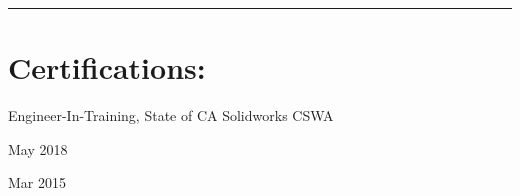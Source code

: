 
\vspace{-.5ex}

{\hspace{-1.73in}\noindent\color{dblue}\rule{6.935in}{0.4pt}} %

\vspace{2.0ex}

\section
{Certifications:}{}

\vspace{-2.0ex}
\begin{detail}
Engineer-In-Training, State of CA 
\vspace{1.0ex}
\newline
Solidworks CSWA 
\end{detail}

\begin{subtitle}
\vspace{-8ex}
{{May 2018}}

\vspace{1.0ex}

{{Mar 2015}}
\end{subtitle}

\vspace{-2ex}
